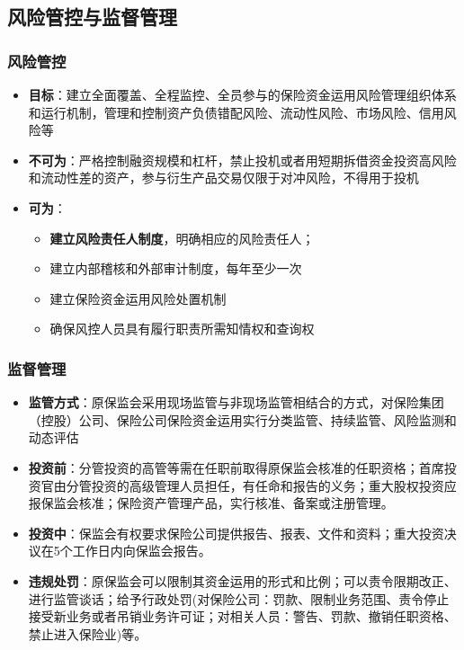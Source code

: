 \documentclass[a4paper,12pt]{ctexbeamer}
\begin{document}
\subsection{风险管控与监督管理}
\begin{frame}
    \frametitle{风险管控}
    \begin{itemize}
        \item \textbf{目标}：建立全面覆盖、全程监控、全员参与的保险资金运用风险管理组织体系和运行机制，管理和控制资产负债错配风险、流动性风险、市场风险、信用风险等
        \item \textbf{不可为}：严格控制融资规模和杠杆，禁止投机或者用短期拆借资金投资高风险和流动性差的资产，参与衍生产品交易仅限于对冲风险，不得用于投机
        \item \textbf{可为}：
              \begin{itemize}
                  \item \textbf{建立风险责任人制度}，明确相应的风险责任人；
                  \item 建立内部稽核和外部审计制度，每年至少一次
                  \item 建立保险资金运用风险处置机制
                  \item 确保风控人员具有履行职责所需知情权和查询权
              \end{itemize}
    \end{itemize}
\end{frame}
\begin{frame}
    \frametitle{监督管理}
    \begin{itemize}
        \item \textbf{监管方式}：原保监会采用现场监管与非现场监管相结合的方式，对保险集团（控股）公司、保险公司保险资金运用实行分类监管、持续监管、风险监测和动态评估
        \item \textbf{投资前}：分管投资的高管等需在任职前取得原保监会核准的任职资格；首席投资官由分管投资的高级管理人员担任，有任命和报告的义务；重大股权投资应报保监会核准；保险资产管理产品，实行核准、备案或注册管理。
        \item \textbf{投资中}：保监会有权要求保险公司提供报告、报表、文件和资料；重大投资决议在5个工作日内向保监会报告。
        \item \textbf{违规处罚}：原保监会可以限制其资金运用的形式和比例；可以责令限期改正、进行监管谈话；给予行政处罚(对保险公司：罚款、限制业务范围、责令停止接受新业务或者吊销业务许可证；对相关人员：警告、罚款、撤销任职资格、禁止进入保险业)等。
    \end{itemize}
\end{frame}
\end{document}
